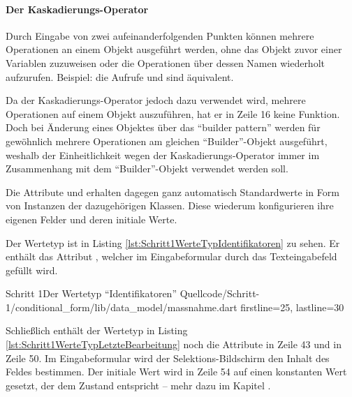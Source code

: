 \paragraph{Der Kaskadierungs-Operator}

Durch Eingabe von zwei aufeinanderfolgenden Punkten  können mehrere Operationen an einem Objekt ausgeführt werden,
ohne das Objekt zuvor einer Variablen zuzuweisen oder die Operationen über dessen Namen wiederholt aufzurufen. Beispiel: die Aufrufe   und  sind äquivalent.

Da der Kaskadierungs-Operator jedoch dazu verwendet wird, mehrere Operationen auf einem Objekt auszuführen, hat er in Zeile 16 keine Funktion.
Doch bei Änderung eines Objektes über das \enquote{builder pattern} werden für gewöhnlich mehrere Operationen am gleichen \enquote{Builder}-Objekt ausgeführt, weshalb der Einheitlichkeit wegen der Kaskadierungs-Operator immer im Zusammenhang mit dem \enquote{Builder}-Objekt verwendet werden soll.

Die Attribute  und   erhalten dagegen ganz automatisch Standardwerte in Form von Instanzen der dazugehörigen Klassen.
Diese wiederum konfigurieren ihre eigenen Felder und deren initiale Werte.



Der Wertetyp  ist in Listing \ref{lst:Schritt1WerteTypIdentifikatoren} zu sehen.
Er enthält das Attribut , welcher im Eingabeformular durch das Texteingabefeld gefüllt wird.

\begin{alexlisting}{Schritt 1}{Der Wertetyp \enquote{Identifikatoren}}
  {Quellcode/Schritt-1/conditional_form/lib/data_model/massnahme.dart}
  {firstline=25, lastline=30}
  \label{lst:Schritt1WerteTypIdentifikatoren}
\end{alexlisting}

Schließlich enthält der Wertetyp  in Listing \ref{lst:Schritt1WerteTypLetzteBearbeitung} noch die Attribute  in Zeile 43 und  in Zeile 50.
Im Eingabeformular wird der Selektions-Bildschirm den Inhalt des Feldes  bestimmen.
Der initiale Wert wird in Zeile 54 auf einen konstanten Wert gesetzt, der dem Zustand  entspricht -- mehr dazu im Kapitel .

